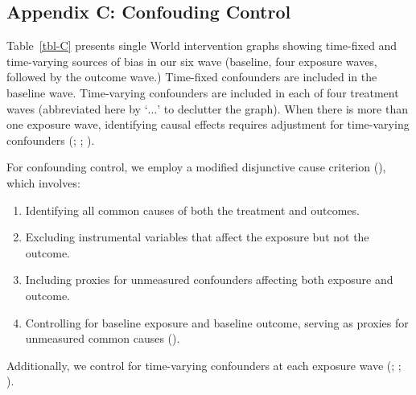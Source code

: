 \documentclass[
  single column]{article}
\providecommand{\tightlist}{%
  \setlength{\itemsep}{0pt}\setlength{\parskip}{0pt}}\usepackage{longtable,booktabs,array}
\begin{document}
\begin{longtable}[t]{lll}
\end{longtable}

\endgroup{}
\endgroup{}

\newpage{}

\subsection{Appendix C: Confouding Control}\label{appendix-confounding}

\begin{table}

\caption{\label{tbl-C}Table~\ref{tbl-C} presents single World
intervention graphs showing time-fixed and time-varying sources of bias
in our six wave (baseline, four exposure waves, followed by the outcome
wave.) Time-fixed confounders are included in the baseline wave.
Time-varying confounders are included in each of four treatment waves
(abbreviated here by `\(\dots\)' to declutter the graph). When there is
more than one exposure wave, identifying causal effects requires
adjustment for time-varying confounders
(;
;
).}

\centering{

\tvtable

}

\end{table}%

For confounding control, we employ a modified disjunctive cause
criterion (), which
involves:

\begin{enumerate}
\def\labelenumi{\arabic{enumi}.}
\tightlist
\item
  Identifying all common causes of both the treatment and outcomes.
\item
  Excluding instrumental variables that affect the exposure but not the
  outcome.
\item
  Including proxies for unmeasured confounders affecting both exposure
  and outcome.
\item
  Controlling for baseline exposure and baseline outcome, serving as
  proxies for unmeasured common causes
  ().
\end{enumerate}

Additionally, we control for time-varying confounders at each exposure
wave (;
;
).
\end{document}
